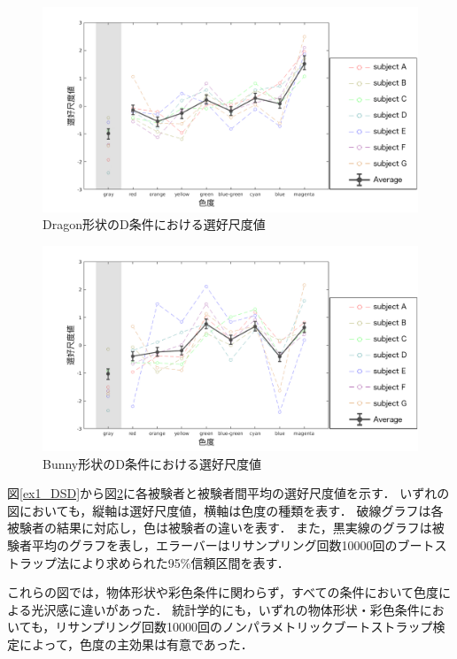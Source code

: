            \newpage
            \begin{figure}[h]
                \centering
                \includegraphics[width=15.0cm]{./img/ex1_res_DD_p.png}
                \caption{Dragon形状のD条件における選好尺度値}
                \label{ex1_DD}
            \end{figure}

            \begin{figure}[h]
                \centering
                \includegraphics[width=15.0cm]{./img/ex1_res_BD_p.png}
                \caption{Bunny形状のD条件における選好尺度値}
                \label{ex1_BD}
            \end{figure}

            図\ref{ex1_DSD}から図\ref{ex1_BD}に各被験者と被験者間平均の選好尺度値を示す．
            いずれの図においても，縦軸は選好尺度値，横軸は色度の種類を表す．
            破線グラフは各被験者の結果に対応し，色は被験者の違いを表す．
            また，黒実線のグラフは被験者平均のグラフを表し，エラーバーはリサンプリング回数10000回のブートストラップ法により求められた95\%信頼区間を表す．

            これらの図では，物体形状や彩色条件に関わらず，すべての条件において色度による光沢感に違いがあった．
            統計学的にも，いずれの物体形状・彩色条件においても，リサンプリング回数10000回のノンパラメトリックブートストラップ検定によって，色度の主効果は有意であった．

